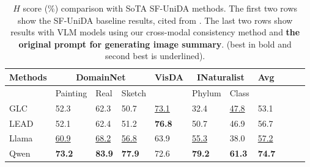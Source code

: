 \documentclass[10pt]{article} %
\begin{document}
\begin{table}[ht]
\caption{$H$ score (\%) comparison with SoTA SF-UniDA methods. 
The first two rows show the SF-UniDA baseline results, cited from \cite{qu2024lead}. The last two rows show results with VLM models using our cross-modal consistency method and \textbf{the original prompt for generating image summary}.
(best in bold and second best is underlined).}
\label{tab: h-score original}
\begin{center}
\begin{tabular}{lllllllllll}
\multicolumn{1}{c}{\bf Methods}  &\multicolumn{3}{c}{\bf DomainNet} &\multicolumn{1}{c}{\bf VisDA} &\multicolumn{2}{c}{\bf INaturalist} & {\bf Avg}
\\ \hline 
  & Painting & Real & Sketch & & Phylum & Class \\
\hline
GLC & 52.3  & 62.3  & 50.7 & \underline{73.1} & 32.4 & \underline{47.8} & 53.1\\
LEAD & 52.1  & 62.4  & 51.2 & \textbf{76.8} & 50.7 & 46.9 & 56.7\\
Llama & \underline{60.9} & \underline{68.2} & \underline{56.8} & 63.9 & \underline{55.3} & 38.0 & \underline{57.2}\\
Qwen & \textbf{73.2} & \textbf{83.9} & \textbf{77.9} & 72.6 & \textbf{79.2} & \textbf{61.3} & \textbf{74.7}\\
\end{tabular}
\end{center}
\end{table}
\end{document}
